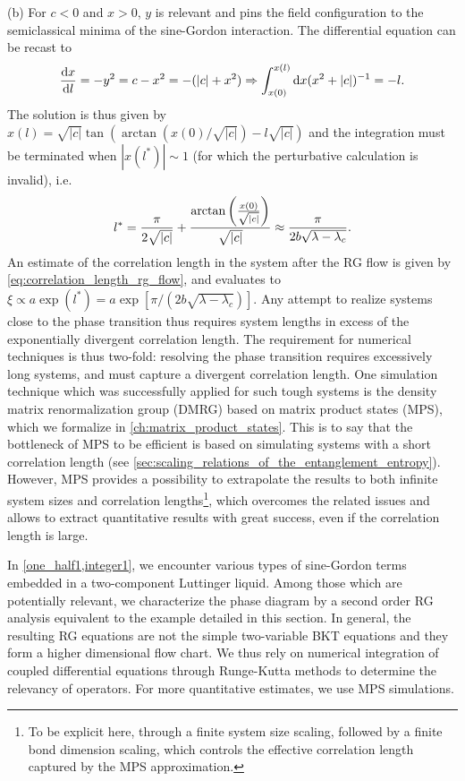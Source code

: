 (b) For $c<0$ and $x>0$, $y$ is relevant and pins the field configuration to the semiclassical minima of the sine-Gordon interaction.
The differential equation can be recast to
\begin{align}
    \frac{\mathrm d x}{\mathrm d l} = -y^2 = c-x^2 = -(|c|+x^2)
    \Rightarrow
    \int_{x(0)}^{x(l)}\mathrm d x(x^2+|c|)^{-1} = -l
    .
\end{align}
The solution is thus given by $x(l) = \sqrt{|c|}\tan(\arctan(x(0)/\sqrt{|c|})-l\sqrt{|c|})$ and the integration must be terminated when $|x(l^*)|\sim 1$ (for which the perturbative calculation is invalid), i.e.
\begin{align}
    l^*=\frac{\pi}{2\sqrt{|c|}}+\frac{\arctan\left( \frac{x(0)}{\sqrt{|c|}} \right)}{\sqrt{|c|}}\approx \frac{\pi}{2b\sqrt{\lambda-\lambda_c}}.
\end{align}
An estimate of the correlation length in the system after the RG flow is given by \cref{eq:correlation_length_rg_flow}, and evaluates to $\xi\propto a\exp(l^*)=a\exp[{{\pi}/({2b\sqrt{\lambda-\lambda_c}})}]$.
Any attempt to realize systems close to the phase transition thus requires system lengths in excess of the exponentially divergent correlation length.
The requirement for numerical techniques is thus two-fold: resolving the phase transition requires excessively long systems, and must capture a divergent correlation length.
One simulation technique which was successfully applied for such tough systems is the density matrix renormalization group (DMRG) based on matrix product states (MPS), which we formalize in \cref{ch:matrix_product_states}.
This is to say that the bottleneck of MPS to be efficient is based on simulating systems with a short correlation length (see \cref{sec:scaling_relations_of_the_entanglement_entropy}).
However, MPS provides a possibility to extrapolate the results to both infinite system sizes and correlation lengths\footnote{To be explicit here, through a finite system size scaling, followed by a finite bond dimension scaling, which controls the effective correlation length captured by the MPS approximation.}, which overcomes the related issues and allows to extract quantitative results with great success, even if the correlation length is large.

In \cref{one_half1,integer1}, we encounter various types of sine-Gordon terms embedded in a two-component Luttinger liquid.
Among those which are potentially relevant, we characterize the phase diagram by a second order RG analysis equivalent to the example detailed in this section.
In general, the resulting RG equations are not the simple two-variable BKT equations and they form a higher dimensional flow chart.
We thus rely on numerical integration of coupled differential equations through Runge-Kutta methods to determine the relevancy of operators.
For more quantitative estimates, we use MPS simulations.
